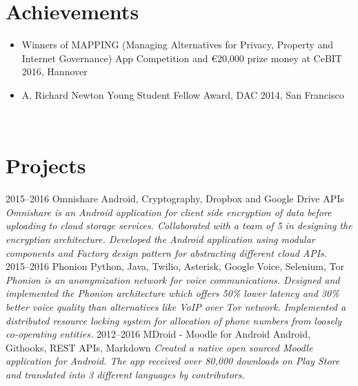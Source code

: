 \documentclass[]{friggeri-cv}
\begin{document}
\section{Achievements}
\begin{itemize}
  \item Winners of MAPPING (Managing Alternatives for Privacy, Property and Internet Governance) App Competition and \euro 20,000 prize money at CeBIT 2016, Hannover
  \item A. Richard Newton Young Student Fellow Award, DAC 2014, San Francisco
\end{itemize}
~

\section{Projects}
\begin{entrylist}
  \entry
    {2015–2016}
    {Omnishare}
    {Android, Cryptography, Dropbox and Google Drive APIs}
    {\emph{Omnishare is an Android application for client side encryption of data before uploading to cloud storage services. Collaborated with a team of 5 in designing the encryption architecture. Developed the Android application using modular components and Factory design pattern for abstracting different cloud APIs.}}
  \entry
    {2015–2016}
    {Phonion}
    {Python, Java, Twilio, Asterisk, Google Voice, Selenium, Tor}
    {\emph{Phonion is an anonymization network for voice communications. Designed and implemented the Phonion architecture which offers 50\% lower latency and 30\% better voice quality than alternatives like VoIP over Tor network. Implemented a distributed resource locking system for allocation of phone numbers from loosely co-operating entities.}}
  \entry
    {2012–2016}
    {MDroid - Moodle for Android}
    {Android, Githooks, REST APIs, Markdown}
    {\emph{Created a native open sourced Moodle application for Android. The app received over 80,000 downloads on Play Store and translated into 3 different languages by contributors.}}
\end{entrylist}
\end{document}
